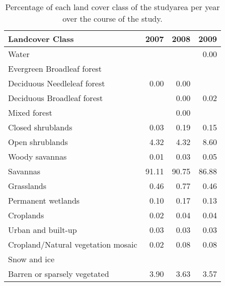\begin{table}[H]
\centering
\caption[Percentage of each LC class per year, NA]{Percentage of each land cover class of the 
                                       studyarea per year over the course of the study.} 
\label{table:mlc_percentage_NA}
\begin{tabular}{lrrr}
  \toprule
Landcover Class & 2007 & 2008 & 2009 \\ 
  \midrule
Water &  &  & 0.00 \\ 
  Evergreen Broadleaf forest &  &  &  \\ 
  Deciduous Needleleaf forest & 0.00 & 0.00 &  \\ 
  Deciduous Broadleaf forest &  & 0.00 & 0.02 \\ 
  Mixed forest &  & 0.00 &  \\ 
  Closed shrublands & 0.03 & 0.19 & 0.15 \\ 
  Open shrublands & 4.32 & 4.32 & 8.60 \\ 
  Woody savannas & 0.01 & 0.03 & 0.05 \\ 
  Savannas & 91.11 & 90.75 & 86.88 \\ 
  Grasslands & 0.46 & 0.77 & 0.46 \\ 
  Permanent wetlands & 0.10 & 0.17 & 0.13 \\ 
  Croplands & 0.02 & 0.04 & 0.04 \\ 
  Urban and built-up & 0.03 & 0.03 & 0.03 \\ 
  Cropland/Natural vegetation mosaic & 0.02 & 0.08 & 0.08 \\ 
  Snow and ice &  &  &  \\ 
  Barren or sparsely vegetated & 3.90 & 3.63 & 3.57 \\ 
   \bottomrule
\end{tabular}
\end{table}
